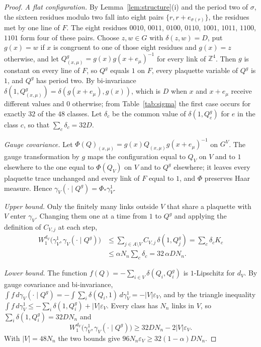 \documentclass[aps,prd,twocolumn,superscriptaddress,nofootinbib,longbibliography,floatfix,amsmath,amssymb,10pt]{revtex4-2}
\theoremstyle{definition}
\theoremstyle{remark}
\newcommand{\Z}{\mathbb{Z}}
\begin{document}
\begin{proof}
\emph{A flat configuration.} By Lemma~\ref{lem:structure}(i) and the period
two of $\sigma$, the sixteen residues modulo two fall into eight pairs
$\{r,r+e_{\sigma(r)}\}$, the residues met by one line of $F$. The eight
residues $0010$, $0011$, $0100$, $0110$, $1001$, $1011$, $1100$, $1101$ form
four of these pairs. Choose $z,w\in G$ with $\delta(z,w)=D$, put $g(x)=w$ if
$x$ is congruent to one of those eight residues and $g(x)=z$ otherwise, and
let $Q^g_{(x,\mu)}=g(x)g(x+e_\mu)^{-1}$ for every link of $\Z^4$. Then $g$ is
constant on every line of $F$, so $Q^g$ equals $1$ on $F$, every plaquette
variable of $Q^g$ is $1$, and $Q^g$ has period two. By bi-invariance
$\delta(1,Q^g_{(x,\mu)})=\delta(g(x+e_\mu),g(x))$, which is $D$ when $x$ and
$x+e_\mu$ receive different values and $0$ otherwise; from
Table~\ref{tab:sigma} the first case occurs for exactly $32$ of the $48$
classes. Let $\delta_c$ be the common value of $\delta(1,Q^g_e)$ for $e$ in
the class $c$, so that $\sum_c\delta_c=32D$.

\emph{Gauge covariance.} Let $\Phi(Q)_{(x,\mu)}=g(x)Q_{(x,\mu)}g(x+e_\mu)^{-1}$
on $G^V$. The gauge transformation by $g$ maps the configuration equal to
$Q_V$ on $V$ and to $1$ elsewhere to the one equal to $\Phi(Q_V)$ on $V$ and
to $Q^g$ elsewhere; it leaves every plaquette trace unchanged and every link
of $F$ equal to $1$, and $\Phi$ preserves Haar measure. Hence
$\gamma_V(\cdot\mid Q^g)=\Phi_*\gamma^1_V$.

\emph{Upper bound.} Only the finitely many links outside $V$ that share a
plaquette with $V$ enter $\gamma_V$. Changing them one at a time from $1$ to
$Q^g$ and applying the definition of $C_{V,j}$ at each step,
\[
\begin{split}
W_1^{d_V}\bigl(\gamma^1_V,\gamma_V(\cdot\mid Q^g)\bigr)&\le\sum_{j\in
A\setminus V}C_{V,j}\,\delta(1,Q^g_j)=\sum_c\delta_cK_c\\
&\le\alpha N_n\sum_c\delta_c=32\,\alpha DN_n .
\end{split}
\]

\emph{Lower bound.} The function $f(Q)=-\sum_{i\in V}\delta(Q_i,Q^g_i)$ is
$1$-Lipschitz for $d_V$. By gauge covariance and bi-invariance, $\int
f\,d\gamma_V(\cdot\mid Q^g)=-\int\sum_i\delta(Q_i,1)\,d\gamma^1_V=-|V|
\varepsilon_V$, and by the triangle inequality $\int f\,d\gamma^1_V\le
-\sum_i\delta(1,Q^g_i)+|V|\varepsilon_V$. Every class has $N_n$ links in $V$,
so $\sum_i\delta(1,Q^g_i)=32DN_n$ and
\[
W_1^{d_V}\bigl(\gamma^1_V,\gamma_V(\cdot\mid Q^g)\bigr)\ge32DN_n-2|V|
\varepsilon_V .
\]
With $|V|=48N_n$ the two bounds give $96N_n\varepsilon_V\ge32(1-\alpha)DN_n$.
\end{proof}
\end{document}

